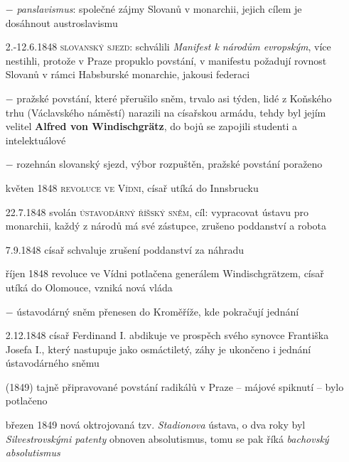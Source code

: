\documentclass{article}
\begin{document}
\begin{itemize}
    \item[$-$] \textit{panslavismus}: společné zájmy Slovanů v monarchii, jejich cílem je dosáhnout austroslavismu
    \item[2.-12.6.1848] \textsc{slovanský sjezd}: schválili \textit{Manifest k národům evropským}, více nestihli, protože v Praze propuklo povstání, v manifestu požadují rovnost Slovanů v rámci Habsburské monarchie, jakousi federaci
    \item[$-$] pražské povstání, které přerušilo sněm, trvalo asi týden, lidé z Koňského trhu (Václavského náměstí) narazili na císařskou armádu, tehdy byl jejím velitel \textbf{Alfred von Windischgrätz}, do bojů se zapojili studenti a intelektuálové
    \item[$-$] rozehnán slovanský sjezd, výbor rozpuštěn, pražské povstání poraženo
    \item[květen 1848] \textsc{revoluce ve Vídni}, císař utíká do Innsbrucku
    \item[22.7.1848] svolán \textsc{ústavodárný říšský sněm}, cíl: vypracovat ústavu pro monarchii, každý z národů má své zástupce, zrušeno poddanství a robota
    \item[7.9.1848] císař schvaluje zrušení poddanství za náhradu
    \item[říjen 1848] revoluce ve Vídni potlačena generálem Windischgrätzem, císař utíká do Olomouce, vzniká nová vláda
    \item[$-$] ústavodárný sněm přenesen do Kroměříže, kde pokračují jednání
    \item[2.12.1848] císař Ferdinand I. abdikuje ve prospěch svého synovce Františka Josefa I., který nastupuje jako osmáctiletý, záhy je ukončeno i jednání ústavodárného sněmu
    \item[(1849)] tajně připravované povstání radikálů v Praze -- májové spiknutí -- bylo potlačeno
    \item[březen 1849] nová oktrojovaná tzv. \textit{Stadionova}  ústava, o dva roky byl \textit{Silvestrovskými patenty} obnoven absolutismus, tomu se pak říká \textit{bachovský absolutismus}
\end{itemize}
\end{document}
